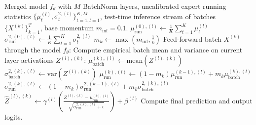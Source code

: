 \documentclass{article}
\theoremstyle{plain}
\theoremstyle{definition}
\theoremstyle{remark}
\begin{document}
\begin{algorithm}[H]
  \caption{Inference-Time Self-Calibration with Prior Warm-starting and Adaptive Momentum Scheduling (ITSC-PW-AMS)}
  \label{alg:itsc_pw_ams}
  \begin{algorithmic}[1]
    \REQUIRE Merged model $f_{\theta}$ with $M$ BatchNorm layers, uncalibrated expert running statistics $\{\mu_t^{(l)}, \sigma_t^{2,(l)}\}_{t=1, l=1}^{K, M}$, test-time inference stream of batches $\{X^{(k)}\}_{k=1}^T$, base momentum $m_{\text{inf}} = 0.1$.
    \STATE {}
      \STATE $\mu_{\text{run}}^{(0), (l)} \leftarrow \frac{1}{K} \sum_{t=1}^K \mu_t^{(l)}$
      \STATE $\sigma_{\text{run}}^{2,(0), (l)} \leftarrow \frac{1}{K} \sum_{t=1}^K \sigma_t^{2,(l)}$
    \ENDFOR
    \STATE {}
      \STATE {}
      \STATE $m_k \leftarrow \max\left(m_{\text{inf}}, \frac{1}{k}\right)$
      \STATE Feed-forward batch $X^{(k)}$ through the model $f_{\theta}$:
        \STATE Compute empirical batch mean and variance on current layer activations $Z^{(l), (k)}$:
        \STATE $\mu_{\text{batch}}^{(k), (l)} \leftarrow \text{mean}(Z^{(l), (k)})$
        \STATE $\sigma_{\text{batch}}^{2,(k), (l)} \leftarrow \text{var}(Z^{(l), (k)})$
        \STATE {}
        \STATE $\mu_{\text{run}}^{(k), (l)} \leftarrow (1 - m_k)\mu_{\text{run}}^{(k-1), (l)} + m_k \mu_{\text{batch}}^{(k), (l)}$
        \STATE $\sigma_{\text{run}}^{2,(k), (l)} \leftarrow (1 - m_k)\sigma_{\text{run}}^{2,(k-1), (l)} + m_k \sigma_{\text{batch}}^{2,(k), (l)}$
        \STATE {}
        \STATE $\hat{Z}^{(l), (k)} \leftarrow \gamma^{(l)} \left( \frac{Z^{(l), (k)} - \mu_{\text{run}}^{(k), (l)}}{\sqrt{\sigma_{\text{run}}^{2,(k), (l)} + \epsilon}} \right) + \beta^{(l)}$
      \ENDFOR
      \STATE Compute final prediction and output logits.
    \ENDFOR
  \end{algorithmic}
\end{algorithm}
\end{document}
